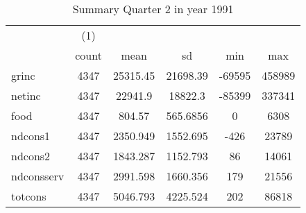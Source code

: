 \begin{table}[htbp]\centering
\def\sym#1{\ifmmode^{#1}\else\(^{#1}\)\fi}
\caption{Summary Quarter 2 in year 1991 \label{sum\_Q2\_y1991}}
\begin{tabular}{l*{1}{ccccc}}
\hline\hline
            &\multicolumn{1}{c}{(1)}&            &            &            &            \\
            &       count&        mean&          sd&         min&         max\\
\hline
grinc       &        4347&    25315.45&    21698.39&      -69595&      458989\\
netinc      &        4347&     22941.9&     18822.3&      -85399&      337341\\
food        &        4347&      804.57&    565.6856&           0&        6308\\
ndcons1     &        4347&    2350.949&    1552.695&        -426&       23789\\
ndcons2     &        4347&    1843.287&    1152.793&          86&       14061\\
ndconsserv  &        4347&    2991.598&    1660.356&         179&       21556\\
totcons     &        4347&    5046.793&    4225.524&         202&       86818\\
\hline\hline
\end{tabular}
\end{table}
